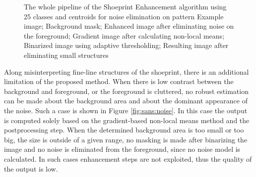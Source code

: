 \documentclass[draft,final]{vutinfth} %
\begin{document}
{\begin{figure}[H]

\caption{The whole pipeline of the Shoeprint Enhancement algorithm using 25 classes and centroids for noise elimination on pattern
				 Example image;  Background mask;  Enhanced image after eliminating noise on the foreground;  Gradient image after calculating non-local means;   Binarized image using adaptive thresholding;  Resulting image after eliminating small structures}
\label{fig:sans:pip}

\end{figure}
}

\par
Along misinterpreting fine-line structures of the shoeprint, there is an additional limitation of the proposed method.
When there is low contrast between the background and foreground, or the foreground is cluttered, no robust estimation can be made about the background area and about the dominant appearance of the noise. 
Such a case is shown in Figure \ref{fig:sans:noise}.
In this case the output is computed solely based on the gradient-based non-local means method and the postprocessing step.
When the determined background area is too small or too big, the size is outside of a given range, no masking is made after binarizing the image and no noise is eliminated from the foreground, since no noise model is calculated.
In such cases enhancement steps are not exploited, thus the quality of the output is low. 
\end{document}
